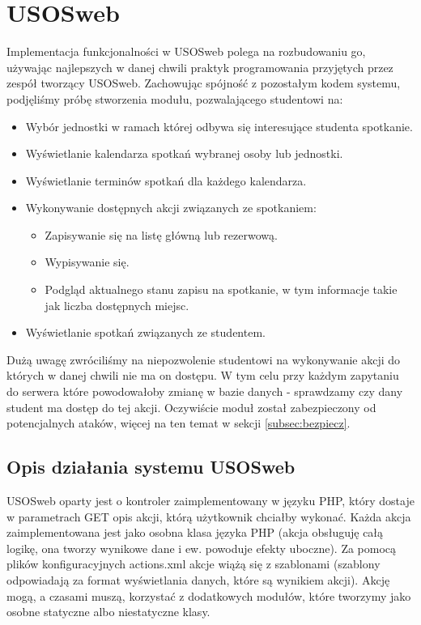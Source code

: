 \documentclass[licencjacka]{pracamgr}
\begin{document}
\section{USOSweb}\label{sec:impusosweb}
Implementacja funkcjonalności w USOSweb polega na rozbudowaniu go, używając najlepszych w danej chwili praktyk programowania przyjętych przez zespół tworzący USOSweb. Zachowując spójność z pozostałym kodem systemu, podjęliśmy próbę stworzenia modułu, pozwalającego studentowi na:
\begin{itemize}
\item{Wybór jednostki w ramach której odbywa się interesujące studenta spotkanie.}
\item{Wyświetlanie kalendarza spotkań wybranej osoby lub jednostki.}
\item{Wyświetlanie terminów spotkań dla każdego kalendarza.}
\item{Wykonywanie dostępnych akcji związanych ze spotkaniem:
\begin{itemize}
\item{Zapisywanie się na listę główną lub rezerwową.}
\item{Wypisywanie się.}
\item{Podgląd aktualnego stanu zapisu na spotkanie, w tym informacje takie jak liczba dostępnych miejsc.}
\end{itemize}
}
\item{Wyświetlanie spotkań związanych ze studentem.}
\end{itemize}

Dużą uwagę zwróciliśmy na niepozwolenie studentowi na wykonywanie akcji do których w danej chwili nie ma on dostępu. W tym celu przy każdym zapytaniu do serwera które powodowałoby zmianę w bazie danych - sprawdzamy czy dany student ma dostęp do tej akcji. Oczywiście moduł został zabezpieczony od potencjalnych ataków, więcej na ten temat w sekcji \ref{subsec:bezpiecz}.
\subsection{Opis działania systemu USOSweb}
USOSweb oparty jest o kontroler zaimplementowany w języku PHP, który dostaje w parametrach GET opis akcji, którą użytkownik chciałby wykonać. Każda akcja zaimplementowana jest jako osobna klasa języka PHP (akcja obsługuję całą logikę, ona tworzy wynikowe dane i ew. powoduje efekty uboczne). Za pomocą plików konfiguracyjnych actions.xml akcje wiążą się z szablonami (szablony odpowiadają za format wyświetlania danych, które są wynikiem akcji). Akcję mogą, a czasami muszą, korzystać z dodatkowych modułów, które tworzymy jako osobne statyczne albo niestatyczne klasy.
\end{document}
